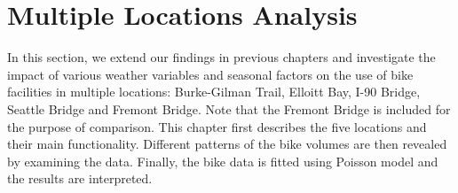 \documentclass [11pt, proquest] {uwthesis}[2015/03/03]
\begin{document}










\newpage
\thispagestyle{empty}
\mbox{}



\chapter{Multiple Locations Analysis}

In this section, we extend our findings in previous chapters and investigate the impact of various weather variables and seasonal factors on the use of bike facilities in multiple locations: Burke-Gilman Trail, Elloitt Bay, I-90 Bridge, Seattle Bridge and Fremont Bridge. Note that the Fremont Bridge is included for the purpose of comparison. This chapter first describes the five locations and their main functionality. Different patterns of the bike volumes are then revealed by examining the data. Finally, the bike data is fitted using Poisson model and the results are interpreted.
\end{document}
